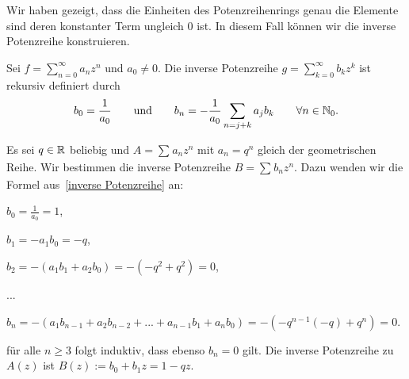 %
%
Wir haben gezeigt, dass die Einheiten des Potenzreihenrings genau die Elemente sind deren konstanter Term ungleich $0$ ist. In diesem Fall können wir die inverse Potenzreihe  konstruieren.\\
\begin{satz}\label{inverse Potenzreihe}
Sei $f = \sum\limits_{n=0}^{\infty}a_nz^n $ und $a_0 \neq 0$. Die inverse Potenzreihe
$g = \sum_{k=0}^\infty b_k z^k$ ist rekursiv definiert durch
\begin{equation*}
b_0 = \frac{1}{a_0} ~~~~~ \text{ und }~~~~~ b_n = -\frac{1}{a_0}\sum\limits_{n = j +k } a_j b_{k}	 ~~~~~~\forall n\in\mathbb{N}_0.
\end{equation*}
\end{satz}
%
\begin{bsp} %
Es sei $q \in \mathbb{R}$ beliebig und $A = \sum_{}^{}a_n z^n$ mit $a_n = q^n$ gleich der geometrischen Reihe. Wir bestimmen die inverse Potenzreihe $B = \sum_{}^{} b_n z^n$. Dazu wenden wir die Formel aus~\ref{inverse Potenzreihe} an:
\begin{center}
\begin{description}
\item $b_0 = \frac{1}{a_0} = 1$,
\item $b_1 = -a_1b_0 = -q$,
\item $b_2 = -\left(a_1b_1 + a_2b_0\right) = -\left(-q^2 + q^2\right) = 0$,
\item ...
\item $b_n = -\left(a_1b_{n-1} + a_2b_{n-2} + ... + a_{n-1}b_1 + a_nb_0\right) = -\left(-q^{n-1}(-q) + q^n\right) = 0$.
\end{description}
\end{center}
für alle $n \ge 3$ folgt induktiv, dass ebenso $b_n = 0$ gilt. Die inverse Potenzreihe zu $A(z)$ ist $B(z) := b_0 + b_1z = 1 - qz$. 
\end{bsp}
%
%
%
%
%
%
%
%
%
%
